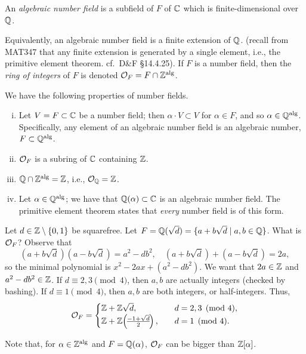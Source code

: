 \begin{definition} \label{defn:number_field}
    An \textit{algebraic number field} is a subfield of $F$ of $\mathbb C$ which is finite-dimensional over $\mathbb Q$.
\end{definition}
Equivalently, an algebraic number field is a finite extension of $\mathbb Q$. (recall from MAT347 that any finite extension is generated by a single element, i.e., the primitive element theorem. cf.\ D\&F \S14.4.25).
If $F$ is a number field, then the \textit{ring of integers} of $F$ is denoted $\mathcal O_F = F \cap \operatorname{\mathbb Z^{\operatorname{alg}}}$.

\begin{remark} \label{rmk:properties_of_number_fields}
    We have the following properties of number fields.
    \begin{enumerate}[(i)]
        \item Let $V = F \subset \mathbb C$ be a number field; then $\alpha \cdot V \subset V$ for $\alpha \in F$, and so $\alpha \in \operatorname{\mathbb Q^{\operatorname{alg}}}$. Specifically, any element of an algebraic number field is an algebraic number, $F \subset \operatorname{\mathbb Q^{\operatorname{alg}}}$.
        \item $\mathcal O_F$ is a subring of $\mathbb C$ containing $\mathbb Z$.
        \item $\mathbb Q \cap \operatorname{\mathbb Z^{\operatorname{alg}}} = \mathbb Z$, i.e., $\mathcal O_\mathbb Q = \mathbb Z$.
        \item Let $\alpha \in \operatorname{\mathbb Q^{\operatorname{alg}}}$; we have that $\mathbb Q(\alpha) \subset \mathbb C$ is an algebraic number field. The primitive element theorem states that \textit{every} number field is of this form.
    \end{enumerate}
\end{remark}

\newpage
\begin{example}
    Let $d \in \mathbb Z \setminus \{0, 1\}$ be squarefree. Let $F = \mathbb Q(\sqrt{d}) = \{a + b \sqrt{d} \mid a, b \in \mathbb Q\}$. What is $\mathcal O_F$? Observe that
    \[ (a + b \sqrt{d})(a - b \sqrt{d}) = a^2 - db^2, \quad (a + b \sqrt{d}) + (a - b \sqrt{d}) = 2a, \]
    so the minimal polynomial is $x^2 - 2ax + (a^2 - db^2)$. We want that $2a \in \mathbb Z$ and $a^2 - db^2 \in \mathbb Z$. If $d \equiv 2, 3 \pmod{4}$, then $a, b$ are actually integers (checked by bashing). If $d \equiv 1 \pmod{4}$, then $a, b$ are both integers, or half-integers. Thus,
    \[ \mathcal O_F = \begin{cases} \mathbb Z + \mathbb Z \sqrt{d}, &\quad d = 2, 3 \pmod{4}, \\
        \mathbb Z + \mathbb Z\!\left(\!\frac{-1 + \sqrt{d}}{2}\!\right),& \quad d = 1 \pmod{4}. \end{cases} \]
\end{example}
Note that, for $\alpha \in \operatorname{\mathbb Z^{\operatorname{alg}}}$ and $F = \mathbb Q(\alpha)$, $\mathcal O_F$ can be bigger than $\mathbb Z[\alpha]$.

